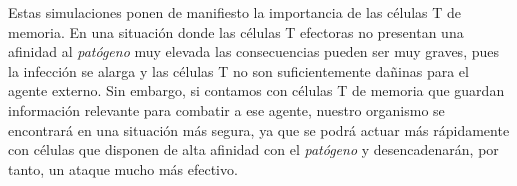 Estas simulaciones ponen de manifiesto la importancia de las células T de memoria. En una situación donde las células T efectoras no presentan una afinidad al \textit{patógeno} muy elevada las consecuencias pueden ser muy graves, pues la infección se alarga y las células T no son suficientemente dañinas para el agente externo. Sin embargo, si contamos con células T de memoria que guardan información relevante para combatir a ese agente, nuestro organismo se encontrará en una situación más segura, ya que se podrá actuar más rápidamente con células que disponen de alta afinidad con el \textit{patógeno} y desencadenarán, por tanto, un ataque mucho más efectivo.




